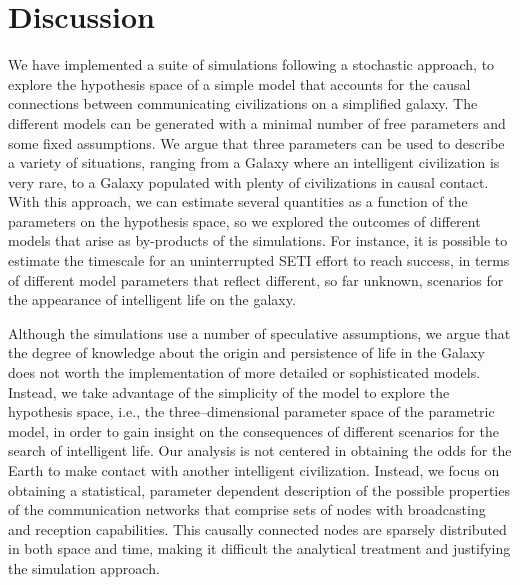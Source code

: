 \documentclass[crop]{CSLB}
\begin{document}
                      




\section{Discussion}\label{S_discussion}

We have implemented a suite of simulations following a stochastic
approach, to explore the hypothesis space of a simple model that
accounts for the causal connections between communicating
civilizations on a simplified galaxy.
%
The different models can be generated with a minimal number of free
parameters and some fixed assumptions.
%
We argue that three parameters can be used to describe a variety of
situations, ranging from a Galaxy where an intelligent civilization is
very rare, to a Galaxy populated with plenty of civilizations in
causal contact.
%
With this approach, we can estimate several quantities as a function
of the parameters on the hypothesis space,
so we explored the outcomes of different models 
that arise as by-products of the simulations.
%
For instance, it is possible to estimate the timescale for an
uninterrupted SETI effort to reach success, in terms of different
model parameters that reflect different, so far unknown, scenarios for
the appearance of intelligent life on the galaxy.






Although the simulations use a number of speculative assumptions, we
argue that the degree of knowledge about the origin and persistence of
life in the Galaxy does not worth the implementation of more detailed
or sophisticated models.
%
Instead, we take advantage of the simplicity of the model to explore
the hypothesis space, i.e., the three--dimensional parameter space of
the parametric model, in order to gain insight on the consequences of
different scenarios for the search of intelligent life.
%
Our analysis is not centered in obtaining the odds for the Earth
to make contact with another intelligent civilization.
%
Instead, we focus on obtaining a statistical, parameter dependent
description of the possible properties of the communication networks
that comprise sets of nodes with broadcasting and reception
capabilities.
%
This causally connected nodes are sparsely distributed in both space
and time, making it difficult the analytical treatment and justifying
the simulation approach.
\end{document}
